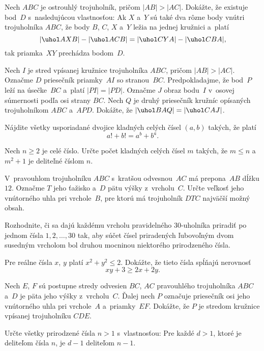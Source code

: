 {%
Nech $ABC$ je ostrouhlý trojuholník, pričom $|AB| > |AC|$. Dokážte, že existuje bod~$D$ s~nasledujúcou vlastnosťou: Ak $X$ a~$Y$ sú také dva rôzne body vnútri trojuholníka $ABC$, že body $B$, $C$, $X$ a~$Y$ ležia na jednej kružnici a~platí
$$
|\uhol AXB| -|\uhol ACB| =|\uhol CYA| - |\uhol CBA|,
$$
tak priamka~$XY$ prechádza bodom~$D$.}

{%
Nech $I$ je stred vpísanej kružnice trojuholníka $ABC$, pričom $|AB| > |AC|$. Označme $D$ priesečník priamky~$AI$ so stranou~$BC$. Predpokladajme, že bod~$P$ leží na úsečke~$BC$ a~platí $|PI|=|PD|$. Označme $J$ obraz bodu~$I$ v~osovej súmernosti podľa osi strany $BC$. Nech $Q$ je druhý priesečník kružníc opísaných trojuholníkom $ABC$ a~$APD$. Dokážte, že $|\uhol BAQ|=|\uhol CAJ|$.}

{%
Nájdite všetky usporiadané dvojice kladných celých čísel $(a,b)$ takých, že platí
$$
a! + b! = a^b + b^a.
$$}

{%
Nech $n\ge 2$ je celé číslo. Určte počet kladných celých čísel $m$ takých, že $m\le n$ a~$ m^2 + 1$ je deliteľné číslom  $n$.}

{%
V~pravouhlom trojuholníku $ABC$ s~kratšou odvesnou~$AC$ má prepona~$AB$ dĺžku $12$. Označme $T$ jeho ťažisko a~$D$ pätu výšky
z~vrcholu~$C$. Určte veľkosť jeho vnútorného uhla pri vrchole~$B$, pre ktorú má trojuholník $DTC$ najväčší možný obsah.}

{%
Rozhodnite, či sa dajú každému vrcholu pravidelného 30-uholníka priradiť po jednom čísla $1,2,\dots ,30$ tak, aby súčet čísel
priradených ľubovoľným dvom susedným vrcholom bol druhou mocninou niektorého prirodzeného čísla.}

{%
Pre reálne čísla $x$, $y$ platí $x^2+y^2\le 2$. Dokážte, že tieto čísla spĺňajú nerovnosť
$$
xy+3\ge 2x+2y.
$$}

{%
Nech $E$, $F$ sú postupne stredy odvesien $BC$, $AC$ pravouhlého trojuholníka $ABC$ a~$D$ je päta jeho výšky z~vrcholu~$C$.
Ďalej nech $P$ označuje priesečník osi jeho vnútorného uhla pri vrchole~$A$ a~priamky~$EF$. Dokážte, že $P$ je stredom kružnice vpísanej
trojuholníku $CDE$.}

{%
Určte všetky prirodzené čísla $n>1$ s~vlastnosťou: Pre každé $d>1$, ktoré je deliteľom čísla $n$, je $d-1$
deliteľom $n-1$.}

